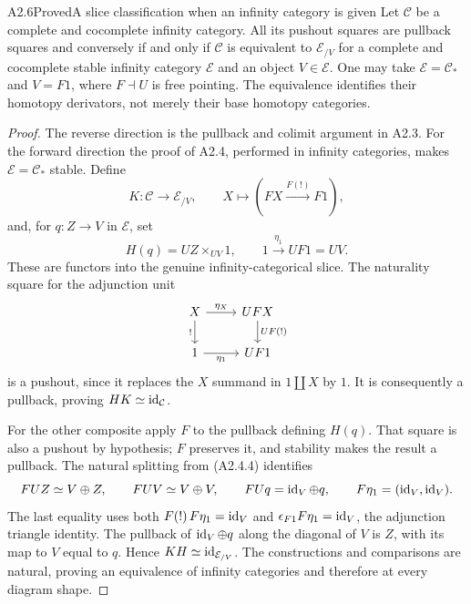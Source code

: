 \begin{claim}{A2.6}{Proved}{A slice classification when an infinity category is given}
\label{A2-enhanced-classification}
Let $\mathcal C$ be a complete and cocomplete infinity category. All its
pushout squares are pullback squares and conversely if and only if
$\mathcal C$ is equivalent to $\mathcal E_{/V}$ for a complete and cocomplete
stable infinity category $\mathcal E$ and an object $V\in\mathcal E$.
One may take $\mathcal E=\mathcal C_*$ and $V=F1$, where $F\dashv U$
is free pointing. The equivalence identifies their homotopy derivators,
not merely their base homotopy categories.
\end{claim}
\begin{proof}
The reverse direction is the pullback and colimit argument in A2.3.
For the forward direction the proof of A2.4, performed in infinity
categories, makes $\mathcal E=\mathcal C_*$ stable. Define
\[
 K:\mathcal C\longrightarrow\mathcal E_{/V},\qquad
 X\longmapsto(FX\xrightarrow{F(!)}F1),
\]
and, for $q:Z\to V$ in $\mathcal E$, set
\[
 H(q)=UZ\times_{UV}1,
 \qquad 1\xrightarrow{\eta_1}UF1=UV.
 \tag{A2.6.1}
\]
These are functors into the genuine infinity-categorical slice. The
naturality square for the adjunction unit
\[
 \begin{tikzcd}
 X\ar[r,"\eta_X"]\ar[d,"!"']&UFX\ar[d,"UF(!)"]\\
 1\ar[r,"\eta_1"']&UF1
 \end{tikzcd}
\]
is a pushout, since it replaces the $X$ summand in $1\amalg X$ by $1$.
It is consequently a pullback, proving $HK\simeq\operatorname{id}_{\mathcal C}$.

For the other composite apply $F$ to the pullback defining $H(q)$. That
square is also a pushout by hypothesis; $F$ preserves it, and stability
makes the result a pullback. The natural splitting from (A2.4.4) identifies
\[
 FUZ\simeq V\oplus Z,\qquad FUV\simeq V\oplus V,\qquad
 FUq=\operatorname{id}_V\oplus q,\qquad F\eta_1=(\operatorname{id}_V,\operatorname{id}_V).
\]
The last equality uses both $F(!)\,F\eta_1=\operatorname{id}_V$ and
$\epsilon_{F1}F\eta_1=\operatorname{id}_V$, the adjunction triangle identity.
The pullback of $\operatorname{id}_V\oplus q$ along the diagonal of $V$ is $Z$, with its
map to $V$ equal to $q$. Hence $KH\simeq\operatorname{id}_{\mathcal E_{/V}}$.
The constructions and comparisons are natural, proving an equivalence
of infinity categories and therefore at every diagram shape.
\end{proof}

